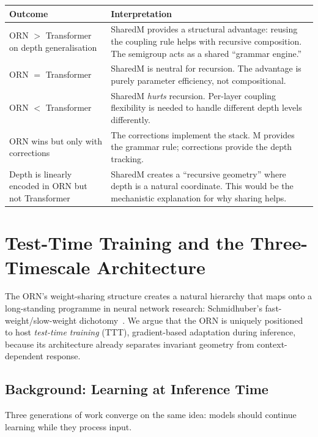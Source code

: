 \documentclass[11pt, a4paper]{article}
\theoremstyle{plain}
\theoremstyle{definition}
\theoremstyle{remark}
\begin{document}
\begin{center}\small
\begin{tabular}{lp{10cm}}
\toprule
\textbf{Outcome} & \textbf{Interpretation} \\
\midrule
ORN $>$ Transformer on depth generalisation & SharedM provides a structural advantage: reusing the coupling rule helps with recursive composition. The semigroup acts as a shared ``grammar engine.'' \\
ORN $=$ Transformer & SharedM is neutral for recursion. The advantage is purely parameter efficiency, not compositional. \\
ORN $<$ Transformer & SharedM \emph{hurts} recursion. Per-layer coupling flexibility is needed to handle different depth levels differently. \\
ORN wins but only with corrections & The corrections implement the stack. M provides the grammar rule; corrections provide the depth tracking. \\
Depth is linearly encoded in ORN but not Transformer & SharedM creates a ``recursive geometry'' where depth is a natural coordinate. This would be the mechanistic explanation for why sharing helps. \\
\bottomrule
\end{tabular}
\end{center}


\section{Test-Time Training and the Three-Timescale Architecture}
\label{sec:ttt}

The ORN's weight-sharing structure creates a natural hierarchy that maps onto a long-standing programme in neural network research: Schmidhuber's fast-weight/slow-weight dichotomy~\cite{schmidhuber1992fast}.
We argue that the ORN is uniquely positioned to host \emph{test-time training} (TTT), gradient-based adaptation during inference, because its architecture already separates invariant geometry from context-dependent response.

\subsection{Background: Learning at Inference Time}

Three generations of work converge on the same idea: models should continue learning while they process input.
\end{document}
